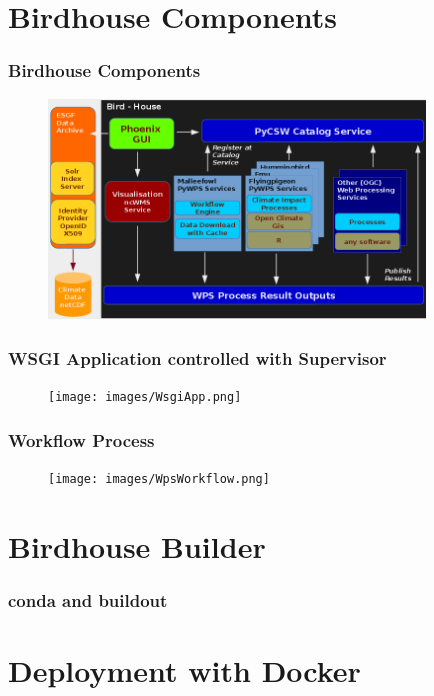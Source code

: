 \documentclass{beamer}
\begin{document}
  \section{Birdhouse Components}

  \begin{frame}
    \frametitle{Birdhouse Components}
    \begin{figure}
      \begin{center}
        \includegraphics[width=10cm]{images/birdhouse.png}
      \end{center}
    \end{figure}
  \end{frame}

  \begin{frame}
    \frametitle{WSGI Application controlled with Supervisor}
    \begin{figure}
      \texttt{[image: images/WsgiApp.png]}
    \end{figure}
  \end{frame}

  \begin{frame}
    \frametitle{Workflow Process}
    \begin{figure}
      \texttt{[image: images/WpsWorkflow.png]}
    \end{figure}
  \end{frame}

  \section{Birdhouse Builder}

  \begin{frame}
    \frametitle{conda and buildout}
  \end{frame}


  \section{Deployment with Docker}
\end{document}
